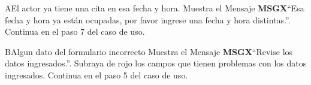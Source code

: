 		\begin{UCtrayectoriaA}{A}{El actor ya tiene una cita en esa fecha y hora.}
			\UCpaso Muestra el Mensaje {\bf MSGX}``Esa fecha y hora ya están ocupadas, por favor ingrese una fecha y hora distintas.''.
			\UCpaso Continua en el paso 7 del caso de uso.
		\end{UCtrayectoriaA}
		\begin{UCtrayectoriaA}{B}{Algun dato del formulario incorrecto}
			\UCpaso Muestra el Mensaje {\bf MSGX}``Revise los datos ingresados.''.
                \UCpaso Subraya de rojo los campos que tienen problemas con los datos ingresados.
			\UCpaso Continua en el paso 5 del caso de uso.
		\end{UCtrayectoriaA}

